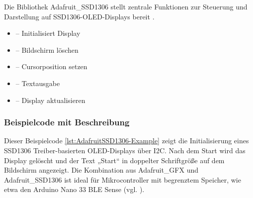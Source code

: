 Die Bibliothek Adafruit\_SSD1306 stellt zentrale Funktionen zur Steuerung und Darstellung auf SSD1306-OLED-Displays bereit \cite{Adafruit:2024OLED}.

\begin{itemize}
	\item {} – Initialisiert Display
	
	\item {} – Bildschirm löschen
	
	\item {} – Cursorposition setzen
	
	\item {} – Textausgabe
	
	\item {} – Display aktualisieren
\end{itemize}

\subsubsection{Beispielcode mit Beschreibung}

Dieser Beispielcode \ref{lst:AdafruitSSD1306-Example} zeigt die Initialisierung eines SSD1306 Treiber-basierten OLED-Displays über I2C. Nach dem Start wird das Display gelöscht und der Text „Start“ in doppelter Schriftgröße auf dem Bildschirm angezeigt. Die Kombination aus Adafruit\_GFX und Adafruit\_SSD1306 ist ideal für Mikrocontroller mit begrenztem Speicher, wie etwa den Arduino Nano 33 BLE Sense (vgl. \cite{Adafruit:2024OLED}).

{
	\label{lst:AdafruitSSD1306-Example}
}





